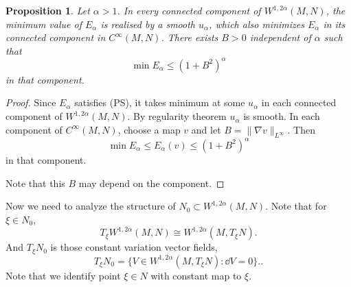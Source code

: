 \documentclass[UTF8,12pt]{article}
\theoremstyle{plain}\newtheorem{theorem}{Theorem}
\theoremstyle{definition}\newtheorem{definition}[theorem]{Definition}
\theoremstyle{definition}\newtheorem{example}[theorem]{Example}
\theoremstyle{plain}\newtheorem{axiom}[theorem]{Axiom}
\theoremstyle{plain}\newtheorem{assertion}[theorem]{Assertion}
\theoremstyle{plain}\newtheorem{corollary}[theorem]{Corollary}
\theoremstyle{plain}\newtheorem{lemma}[theorem]{Lemma}
\theoremstyle{plain}\newtheorem{proposition}[theorem]{Proposition}
\theoremstyle{plain}\newtheorem{prop}[theorem]{Proposition}
\theoremstyle{plain}\newtheorem{conjecture}[theorem]{Conjecture}
\theoremstyle{plain}\newtheorem{conj}[theorem]{Conjecture}
\theoremstyle{plain}\newtheorem{problem}[theorem]{Problem}
\theoremstyle{remark}\newtheorem{notation}[theorem]{Notation}
\theoremstyle{definition}\newtheorem*{question}{Question}
\theoremstyle{definition}\newtheorem*{answer}{Answer}
\theoremstyle{definition}\newtheorem*{goal}{Goal}
\theoremstyle{plain}\newtheorem*{application}{Application}
\theoremstyle{plain}\newtheorem*{exercise}{Exercise}
\theoremstyle{remark}\newtheorem*{remark}{Remark}
\theoremstyle{remark}\newtheorem*{note}{\small{Note}}
\numberwithin{equation}{section}
\numberwithin{theorem}{section}
\numberwithin{figure}{section}
\begin{document}
\begin{prop}
    Let \(\alpha>1\). In every connected component of \(W^{1,2\alpha}(M,N)\),
    the minimum value of \(E_\alpha\) is realised by a smooth \(u_\alpha\),
    which also minimizes \(E_\alpha\) in its connected component in \(C^\infty(M,N)\).
    There exists \(B>0\) independent of \(\alpha\) such that \[
        \min E_\alpha \le (1+B^2)^\alpha
    \] in that component.
\end{prop}
\begin{proof}
    Since \(E_\alpha\) satisfies (PS), it takes minimum at some \(u_\alpha\) in 
    each connected component of \(W^{1,2\alpha}(M,N)\). By regularity theorem
    \(u_\alpha\) is smooth. In each component of \(C^\infty(M,N)\), choose a map \(v\)
    and let \(B=\|\nabla v\|_{L^\infty}\). Then \[
        \min E_\alpha\le E_\alpha(v)\le (1+B^2)^\alpha
    \] in that component.

    Note that this \(B\) may depend on the component.
\end{proof}
Now we need to analyze the structure of \(N_0\subset W^{1,2\alpha}(M,N)\). Note that
for \(\xi\in N_0\), \[
    T_\xi W^{1,2\alpha}(M,N)\cong W^{1,2\alpha}(M,T_\xi N)
.\] And \(T_\xi N_0\) is those constant variation vector fields, \[
    T_\xi N_0=\{V\in W^{1,2\alpha}(M,T_\xi N):\dd{V}=0\}.
.\] Note that we identify point \(\xi\in N\) with constant map to \(\xi\).
\end{document}
